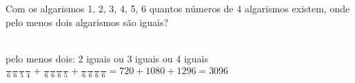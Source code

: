 \begin{ex}
 Com os algarismos 1, 2, 3, 4, 5, 6 quantos números de 4 algarismos existem, onde pelo menos dois algarismos são iguais?
   \begin{sol}
    \phantom{A} \\
    pelo menos dois: 2 iguais ou 3 iguais ou 4 iguais \\
    $\frac{\phantom{A}}{6}\frac{\phantom{A}}{6}\frac{\phantom{A}}{5}\frac{\phantom{A}}{4}+\frac{\phantom{A}}{6}\frac{\phantom{A}}{6}\frac{\phantom{A}}{6}\frac{\phantom{A}}{5}+\frac{\phantom{A}}{6}\frac{\phantom{A}}{6}\frac{\phantom{A}}{6}\frac{\phantom{A}}{6}=720+1080+1296=3096$
   \end{sol}
\end{ex}